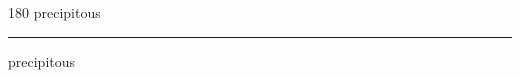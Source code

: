 
\begin{frame}
\begin{center}
\begin{turn}{180}
{\fontsize{2.5cm}{1em}\selectfont precipitous}
\end{turn}
\vspace{1em}\par  
\hrule
\vspace{1em}\par  
{\fontsize{2.5cm}{1em}\selectfont precipitous}
\end{center}
\end{frame}
